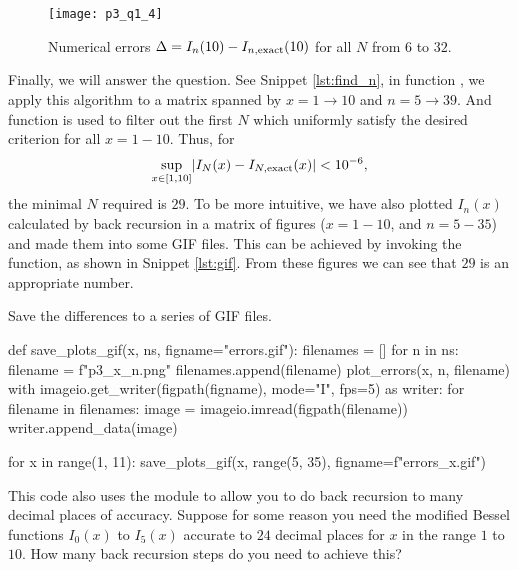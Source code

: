 \begin{figure}[H]
    \centering
    \texttt{[image: p3\_q1\_4]}
    \caption{Numerical errors \(\Delta = I_n(10) - I_{n,\textnormal{exact}}(10)\)
        for all \(N\) from \(6\) to \(32\).}
    \label{fig:plot_errors_10}
\end{figure}

Finally, we will answer the question. See Snippet \ref{lst:find_n},
in function , we apply this algorithm to a matrix spanned by
\(x = 1 \to 10\) and \(n = 5 \to 39\).
And function  is used to filter out the first \(N\) which uniformly
satisfy the desired criterion for all \(x = 1 - 10\).
Thus, for
%
\begin{equation}
    \sup_{x \in [1, 10]} \lvert I_N(x) - I_{N,\textnormal{exact}}(x) \rvert < 10^{-6},
\end{equation}
%
the minimal \(N\) required is \(29\).
To be more intuitive, we have also plotted \(I_n(x)\) calculated by back recursion
in a matrix of figures (\(x = 1 - 10\), and \(n = 5 - 35\)) and made them into some GIF files.
This can be achieved by invoking the  function, as shown in
Snippet \ref{lst:gif}. From these figures we can see that \(29\) is an appropriate number.

\begin{algorithm}[H]
    \caption{Save the differences to a series of GIF files.}
    \label{lst:gif}
    \begin{pythoncode}
        def save_plots_gif(x, ns, figname="errors.gif"):
            filenames = []
            for n in ns:
                filename = f"p3_{x}_{n}.png"
                filenames.append(filename)
                plot_errors(x, n, filename)
            with imageio.get_writer(figpath(figname), mode="I", fps=5) as writer:
                for filename in filenames:
                    image = imageio.imread(figpath(filename))
                    writer.append_data(image)

        for x in range(1, 11):
            save_plots_gif(x, range(5, 35), figname=f"errors_{x}.gif")
        \end{pythoncode}
\end{algorithm}

\Question This code also uses the  module to allow you to do back recursion to many
decimal places of accuracy. Suppose for some reason you need the modified Bessel functions
\(I_0(x)\) to \(I_5(x)\) accurate to \(24\) decimal places for \(x\) in the range \(1\) to \(10\). How
many back recursion steps do you need to achieve this?

